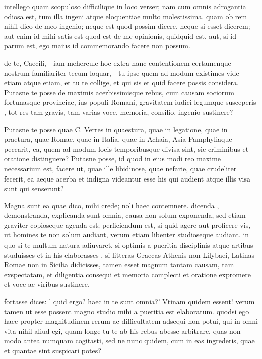  intellego quam scopuloso difficilique in loco verser; nam cum omnis adrogantia odiosa est, tum illa ingeni atque eloquentiae multo molestissima. quam ob rem nihil dico de meo ingenio; neque est quod possim dicere, neque si esset dicerem; aut enim id mihi satis est quod est de me opinionis, quidquid est, aut, si id parum est, ego maius id commemorando facere non possum.

 de te, Caecili,—iam mehercule hoc extra hanc contentionem certamenque nostrum familiariter tecum loquar,—tu ipse quem ad modum existimes vide etiam atque etiam, et tu te collige, et qui sis et quid facere possis considera. Putasne te posse de maximis acerbissimisque rebus, cum causam sociorum fortunasque provinciae, ius populi Romani, gravitatem iudici legumque susceperis , tot res tam gravis, tam varias voce, memoria, consilio, ingenio sustinere?

 Putasne te posse quae C. Verres in quaestura, quae in legatione, quae in praetura, quae Romae, quae in Italia, quae in Achaia, Asia Pamphyliaque peccarit, ea, quem ad modum locis temporibusque divisa sint, sic criminibus et oratione distinguere? Putasne posse, id quod in eius modi reo maxime necessarium est, facere ut, quae ille libidinose, quae nefarie, quae crudeliter fecerit, ea aeque acerba et indigna videantur esse his qui audient atque illis visa sunt qui senserunt?

 Magna sunt ea quae dico, mihi crede; noli haec contemnere. dicenda , demonstranda, explicanda sunt omnia, causa non solum exponenda, sed etiam graviter copioseque agenda est; perficiendum est, si quid agere aut proficere vis, ut homines te non solum audiant, verum etiam libenter studioseque audiant. in quo si te multum natura adiuvaret, si optimis a pueritia disciplinis atque artibus studuisses et in his elaborasses , si litteras Graecas Athenis non Lilybaei, Latinas Romae non in Sicilia didicisses, tamen esset magnum tantam causam, tam exspectatam, et diligentia consequi et memoria complecti et oratione expromere et voce ac viribus sustinere.

 fortasse dices: ' quid ergo? haec in te sunt omnia?' Vtinam quidem essent! verum tamen ut esse possent magno studio mihi a pueritia est elaboratum. quodsi ego haec propter magnitudinem rerum ac difficultatem adsequi non potui, qui in omni vita nihil aliud egi, quam longe tu te ab his rebus abesse arbitrare, quas non modo antea numquam cogitasti, sed ne nunc quidem, cum in eas ingrederis, quae et quantae sint suspicari potes?

